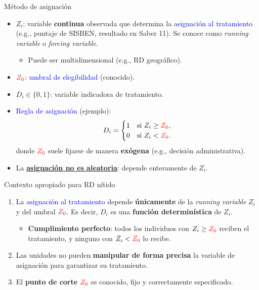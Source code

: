 \documentclass[10pt, xcolor=dvipsnames]{beamer}
\begin{document}
\begin{frame}{Método de asignación}
\begin{itemize}
    \item $Z_i$: variable \textbf{continua} observada que determina la \textcolor{blue}{asignación al tratamiento} 
    (e.g., puntaje de SISBEN, resultado en Saber 11). Se conoce como \textit{running variable} o \textit{forcing variable}. \smallspace
    \begin{itemize}
        \item Puede ser multidimensional (e.g., RD geográfico).  
    \end{itemize}  
    \vspace{0.15cm}
    \item $\textcolor{red}{Z_0}$: \textcolor{blue}{umbral de elegibilidad} (conocido). \smallspace
    \item $D_i \in \{0,1\}$: variable indicadora de tratamiento. \vspace{0.15cm}
    \item \textcolor{blue}{Regla de asignación} (ejemplo):
    \[
        D_i =
        \begin{cases}
            1 & \text{si } Z_i \geq \textcolor{red}{Z_0},\\
            0 & \text{si } Z_i < \textcolor{red}{Z_0}.
        \end{cases}
    \]
    donde $\textcolor{red}{Z_0}$ suele fijarse de manera \textbf{exógena} (e.g., decisión administrativa). \smallspace
    \item La \textbf{\underline{asignación no es aleatoria}}: depende enteramente de $Z_i$.
\end{itemize}
\end{frame}


\begin{frame}{Contexto apropiado para RD nítido}
\begin{enumerate}
    \item La \textcolor{blue}{asignación al tratamiento} depende \textbf{únicamente} de la \textit{running variable} $Z_i$ y del umbral $\textcolor{red}{Z_0}$. Es decir, $D_i$ es una \textbf{función determinística} de $Z_i$. \smallspace
    \begin{itemize}
        \item \textbf{Cumplimiento perfecto}: todos los individuos con $Z_i \geq \textcolor{red}{Z_0}$ reciben el tratamiento, y ninguno con $Z_i < \textcolor{red}{Z_0}$ lo recibe. \smallspace	
    \end{itemize}
    \item Las unidades no pueden \textbf{manipular de forma precisa} la variable de asignación para garantizar su tratamiento. \smallspace
    \smallspace
    \item El \textbf{punto de corte} $\textcolor{red}{Z_0}$ es conocido, fijo y correctamente especificado. \smallspace
\end{enumerate}	
\end{frame}
\end{document}
